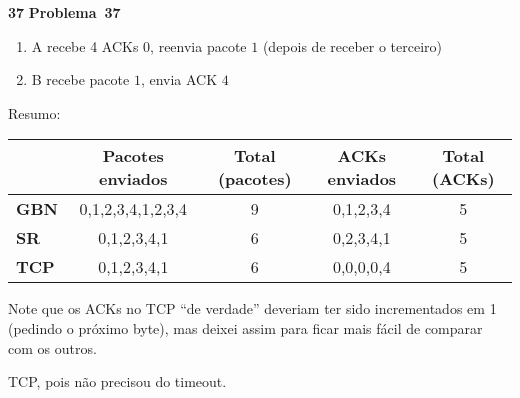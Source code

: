 \documentclass{article}
\newcounter{exe-list}
\newenvironment{exe-list}
    {\begin{list}{\alph{exe-list}.}{\usecounter{exe-list}}}
    {\end{list}}
\newenvironment{exe}[2][Problema]
    {\newcommand{\opt}{(Opcional)}%
    \newcommand{\sketch}[1]{{\bfseries Rascunho:} ##1}%
    \medskip\par\noindent\ifthenelse{\equal{#1}{}}
        {\textbf{\large #2}}
        {\textbf{\large #1~#2}}%
    \medskip\par\noindent}
    {\medskip}
\begin{document}
\begin{exe}{37}
\begin{exe-list}
\begin{itemize}
\begin{enumerate}
                        (total 4)
                    \item A recebe 4 ACKs \(0\),
                        reenvia pacote \(1\)
                        (depois de receber o terceiro)
                    \item B recebe pacote \(1\),
                        envia ACK \(4\)
                \end{enumerate}
        \end{itemize}
        Resumo:
        {\par\centering\begin{tabular}{|l|c|c|c|c|}\hline
            & \textbf{Pacotes enviados} & \textbf{Total (pacotes)}
                & \textbf{ACKs enviados} & \textbf{Total (ACKs)}
                \\\hline
            \textbf{GBN} & 0,1,2,3,4,1,2,3,4 & 9 & 0,1,2,3,4 & 5
                \\\hline
            \textbf{SR}  & 0,1,2,3,4,1 & 6 & 0,2,3,4,1 & 5 \\\hline
            \textbf{TCP} & 0,1,2,3,4,1 & 6 & 0,0,0,0,4 & 5 \\\hline
        \end{tabular}\medskip}
        Note que os ACKs no TCP ``de verdade'' deveriam ter sido
        incrementados em 1 (pedindo o próximo byte),
        mas deixei assim para ficar mais fácil de comparar
        com os outros.
    \item TCP, pois não precisou do timeout.
    \end{exe-list}
\end{exe}
\end{document}
